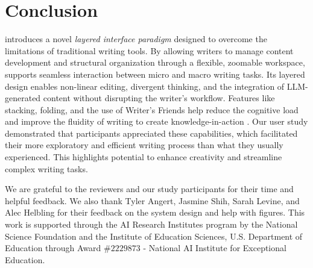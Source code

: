 \section{Conclusion}

\system introduces a novel \textit{layered interface paradigm} designed to overcome the limitations of traditional writing tools. By allowing writers to manage content development and structural organization through a flexible, zoomable workspace, \system supports seamless interaction between micro and macro writing tasks. Its layered design enables non-linear editing, divergent thinking, and the integration of LLM-generated content without disrupting the writer's workflow. Features like stacking, folding, and the use of Writer's Friends help reduce the cognitive load and improve the fluidity of writing to create knowledge-in-action \cite {bamberger1983learning}. Our user study demonstrated that participants appreciated these capabilities, which facilitated their more exploratory and efficient writing process than what they usually experienced. This highlights \systems potential to enhance creativity and streamline complex writing tasks.

\begin{acks}
  We are grateful to the reviewers and our study participants for their time and helpful feedback. We also thank Tyler Angert, Jasmine Shih, Sarah Levine, and Alec Helbling for their feedback on the system design and help with figures.  This work is supported through the AI Research Institutes program by the National Science Foundation and the Institute of Education Sciences, U.S. Department of Education through Award $\#2229873$ - National AI Institute for Exceptional Education.
\end{acks}